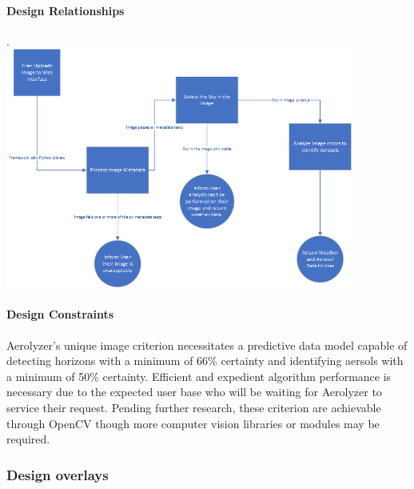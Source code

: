 \documentclass[onecolumn, draftclsnofoot,10pt, compsoc]{IEEEtran}
\begin{document}
\begin{singlespace}
          \paragraph{Design Relationships}
					.\\
					\includegraphics[width=4.5in,natwidth=1907,natheight=787]{images/Design2.png}

          \paragraph{Design Constraints}
          		Aerolyzer’s unique image criterion necessitates a predictive data model capable of detecting horizons with a minimum of 66\% certainty and identifying aersols with a minimum of 50\% certainty. Efficient and expedient algorithm performance is necessary due to the expected user base who will be waiting for Aerolyzer to service their request. Pending further research, these criterion are achievable through OpenCV though more computer vision libraries or modules may be required.
      
      \subsubsection{Design overlays}

\end{singlespace}
\end{document}
